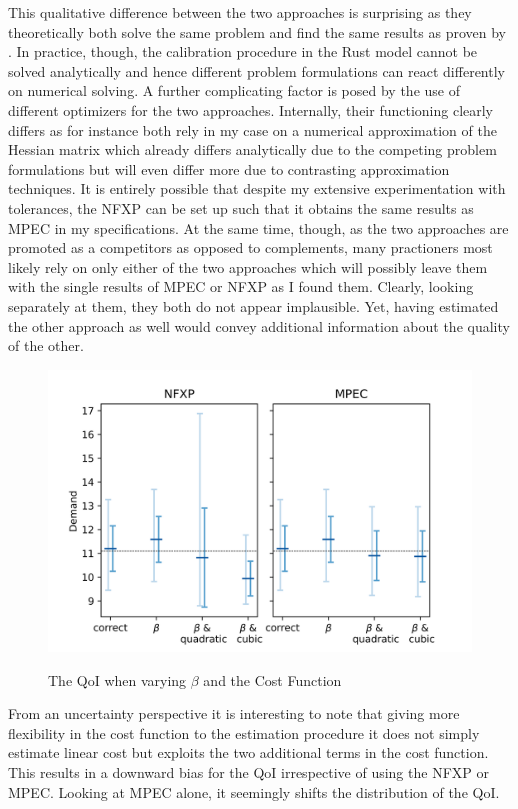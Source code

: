 This qualitative difference between the two approaches is surprising as they theoretically both solve the same problem and find the same results as proven by \cite{Su.Judd.2012}. In practice, though, the calibration procedure in the Rust model cannot be solved analytically and hence different problem formulations can react differently on numerical solving. A further complicating factor is posed by the use of different optimizers for the two approaches. Internally, their functioning clearly differs as for instance both rely in my case on a numerical approximation of the Hessian matrix which already differs analytically due to the competing problem formulations but will even differ more due to contrasting approximation techniques. It is entirely possible that despite my extensive experimentation with tolerances, the NFXP can be set up such that it obtains the same results as MPEC in my specifications. At the same time, though, as the two approaches are promoted as a competitors as opposed to complements, many practioners most likely rely on only either of the two approaches which will possibly leave them with the single results of MPEC or NFXP as I found them. Clearly, looking separately at them, they both do not appear implausible. Yet, having estimated the other approach as well would convey additional information about the quality of the other.

\begin{figure}[!b]
	\caption{The QoI when varying $\beta$ and the Cost Function}
	\vspace*{-4mm}
	\centering
	\includegraphics[scale=0.9]{../figures/figure_6.png}
	\label{figure6}
\end{figure}

From an uncertainty perspective it is interesting to note that giving more flexibility in the cost function to the estimation procedure it does not simply estimate linear cost but exploits the two additional terms in the cost function. This results in a downward bias for the QoI irrespective of using the NFXP or MPEC. Looking at MPEC alone, it seemingly shifts the distribution of the QoI.

